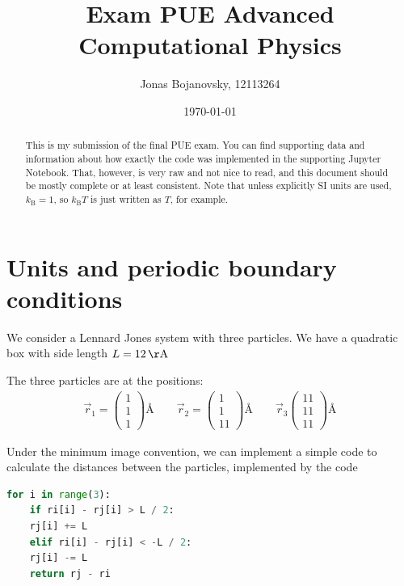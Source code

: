 \documentclass[11pt]{article}
\title{Exam PUE Advanced Computational Physics}
\author{Jonas Bojanovsky, 12113264}
\date{\today}
\newcommand{\sub}[1]{_{\text{#1}}}
\begin{document}
\maketitle

\begin{abstract}
This is my submission of the final PUE exam. You can find supporting data and information about how exactly the code was implemented in the supporting Jupyter Notebook. That, however, is very raw and not nice to read, and this document should  be mostly complete or at least consistent.
Note that unless explicitly SI units are used, $k\sub B = 1$, so $k\sub BT$ is just written as $T$, for example.
\end{abstract}

\section{Units and periodic boundary conditions}

We consider a Lennard Jones system with three particles. We have a quadratic box with side length $ L = \SI{12}{\AA} $

The three particles are at the positions:
\begin{align}
	\vec r_1 = \begin{pmatrix}
		1\\1\\1
	\end{pmatrix}\si{\angstrom}
\qquad
\vec r_2 = 
\begin{pmatrix}
	1\\1\\11
\end{pmatrix}
\si{\angstrom}
\qquad
\vec r_3
\begin{pmatrix}
	11\\11\\11
\end{pmatrix}\si{\angstrom}
\end{align}

Under the minimum image convention, we can implement a simple code to calculate the distances between the particles, implemented by the code
\begin{lstlisting}[language = Python, caption={Implementing Minimum image convention}]
 for i in range(3):
	if ri[i] - rj[i] > L / 2:
	rj[i] += L
	elif ri[i] - rj[i] < -L / 2:
	rj[i] -= L
	return rj - ri
\end{lstlisting}
\end{document}
